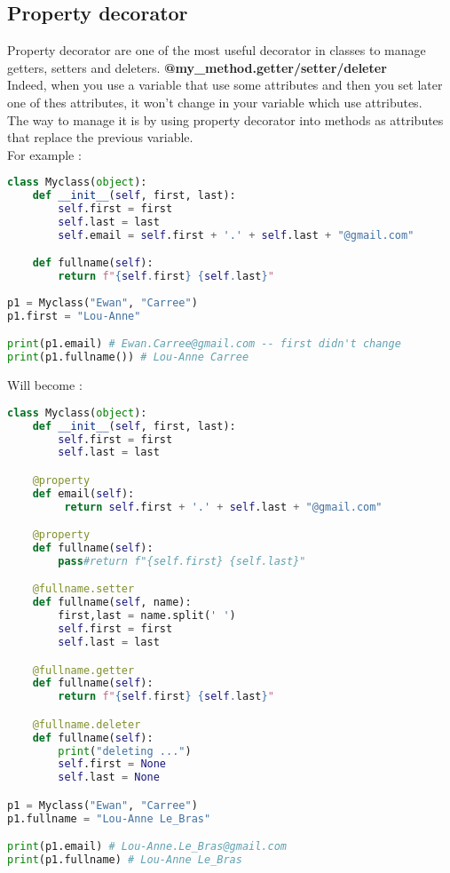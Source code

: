 \documentclass[a4paper, 12pt, titlepage]{scrartcl} %
\begin{document}
\subsection{Property decorator}
\label{subsec:Property}
Property decorator are one of the most useful decorator in classes to manage getters, setters and deleters. \textbf{@my\_method.getter/setter/deleter}\\
Indeed, when you use a variable that use some attributes and then you set later one of thes attributes, it won't change in your variable which use attributes. \\
The way to manage it is by using property decorator into methods as attributes that replace the previous variable. \\
For example :
\begin{lstlisting}[language=Python]
class Myclass(object):
	def __init__(self, first, last):
		self.first = first
		self.last = last
		self.email = self.first + '.' + self.last + "@gmail.com"

	def fullname(self):
		return f"{self.first} {self.last}"
		
p1 = Myclass("Ewan", "Carree")
p1.first = "Lou-Anne"

print(p1.email) # Ewan.Carree@gmail.com -- first didn't change
print(p1.fullname()) # Lou-Anne Carree
\end{lstlisting} \vspace{5mm}
Will become :
\begin{lstlisting}[language=Python]
class Myclass(object):
	def __init__(self, first, last):
		self.first = first
		self.last = last

	@property
	def email(self):
		 return self.first + '.' + self.last + "@gmail.com"

	@property
	def fullname(self):
		pass#return f"{self.first} {self.last}"

	@fullname.setter
	def fullname(self, name):
		first,last = name.split(' ')
		self.first = first
		self.last = last

	@fullname.getter
	def fullname(self):
		return f"{self.first} {self.last}"

	@fullname.deleter
	def fullname(self):
		print("deleting ...")
		self.first = None
		self.last = None

p1 = Myclass("Ewan", "Carree")
p1.fullname = "Lou-Anne Le_Bras"

print(p1.email) # Lou-Anne.Le_Bras@gmail.com
print(p1.fullname) # Lou-Anne Le_Bras
\end{lstlisting} \vspace{5mm}
\end{document}
